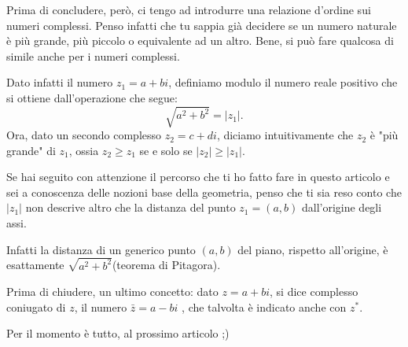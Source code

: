Prima di concludere, però, ci tengo ad introdurre una relazione d'ordine sui numeri complessi. Penso infatti che tu sappia già decidere se un numero naturale è più grande, più piccolo o equivalente ad un altro.
Bene, si può fare qualcosa di simile anche per i numeri complessi.

Dato infatti il numero $ z_1=a+bi $, definiamo modulo il numero reale positivo che si ottiene dall'operazione che segue:
\[\sqrt{a^2 + b^2}= \lvert z_1\rvert.
\]
Ora, dato un secondo complesso $ z_2=c+di  $, diciamo intuitivamente che $ z_2 $ è "più grande" di $ z_1 $, ossia $ z_2\geq z_1 $ se e solo se $ |z_2|\geq|z_1| $.

Se hai seguito con attenzione il percorso che ti ho fatto fare in questo articolo e sei a conoscenza delle nozioni base della geometria, penso che ti sia reso conto che $ |z_1| $ non descrive altro che la distanza del punto $ z_1=(a,b) $ dall'origine degli assi.

Infatti la distanza di un generico punto $ (a,b) $ del piano, rispetto all'origine, è esattamente $ \sqrt{a^2+b^2}$(teorema di Pitagora).

Prima di chiudere, un ultimo concetto: dato $ z=a+bi  $, si dice complesso coniugato di $ z $, il numero $ \bar{z} = a-bi $ , che talvolta è indicato anche con $ z^{*} $.

Per il momento è tutto, al prossimo articolo ;) 